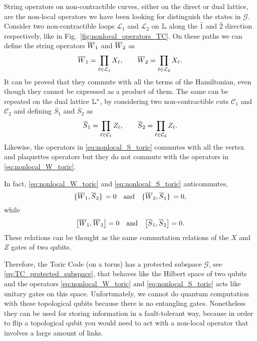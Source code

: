 String operators on non-contractible curves, either on the direct or dual lattice, are the non-local operators we have been looking for distinguish the states in $\mathcal{G}$.
Consider two non-contractible loops $\mathcal{L}_{1}$ and $\mathcal{L}_{2}$ on $\mathbb{L}$ along the $\hat{1}$ and $\hat{2}$ direction respectively, like in Fig.~\ref{fig:nonlocal_operators_TC}.
On these paths we can define the string operators $\overline{W}_1$ and $\overline{W}_2$ as
\begin{equation}
    \overline{W}_1 = \prod_{\ell \in \mathcal{L}_1} X_\ell, \qquad
    \overline{W}_2 = \prod_{\ell \in \mathcal{L}_2} X_\ell.
    \label{eq:nonlocal_W_toric}
\end{equation}
It can be proved that they commute with all the terms of the Hamiltonian, even though they cannot be expressed as a product of them.
The same can be repeated on the dual lattice $\mathbb{L}^{\ast}$, by considering two non-contractible cuts $\mathcal{C}_1$ and $\mathcal{C}_2$ and defining $\overline{S}_1$ and $\overline{S}_2$ as
\begin{equation}
    \overline{S}_1 = \prod_{\ell \in \mathcal{C}_1} Z_\ell, \qquad
    \overline{S}_2 = \prod_{\ell \in \mathcal{C}_2} Z_\ell.
    \label{eq:nonlocal_S_toric}
\end{equation}
Likewise, the operators in \eqref{eq:nonlocal_S_toric} commutes with all the vertex and plaquettes operators but they do not commute with the operators in \eqref{eq:nonlocal_W_toric}.

In fact, \eqref{eq:nonlocal_W_toric} and \eqref{eq:nonlocal_S_toric} anticommutes,
\begin{equation}
    \acomm*{\Wilson_1}{\overline{S}_2} = 0 \qand
    \acomm*{\Wilson_2}{\overline{S}_1} = 0,
    \label{eq:anticommutation_W_S_toric}
\end{equation}
while
\begin{equation}
    \comm{\Wilson_1}{\Wilson_2} = 0 \qand
    \comm{\overline{S}_1}{\overline{S}_2} = 0.
\end{equation}
These relations can be thought as the same commutation relations of the $X$ and $Z$ gates of two qubits.

Therefore, the Toric Code (on a torus) has a protected subspace $\mathcal{G}$, see \eqref{eq:TC_protected_subspace}, that behaves like the Hilbert space of two qubits and the operators \eqref{eq:nonlocal_W_toric} and \eqref{eq:nonlocal_S_toric} acts like unitary gates on this space.
Unfortunately, we cannot do quantum computation with these topological qubits because there is no entangling gates.
Nonetheless they can be used for storing information in a fault-tolerant way, because in order to flip a topological qubit you would need to act with a non-local operator that involves a large amount of links.


